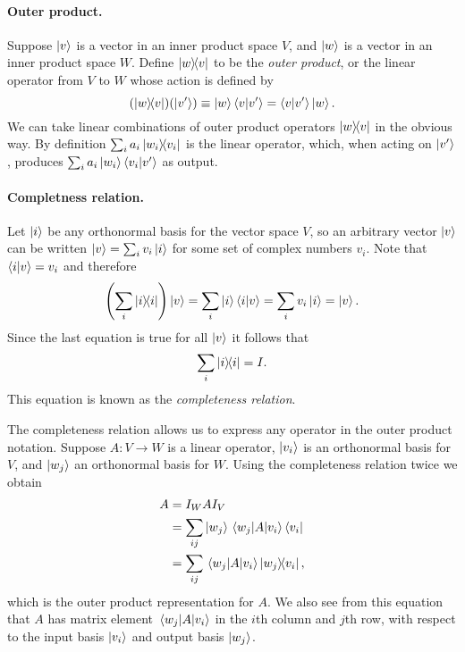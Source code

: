\paragraph{Outer product.} Suppose $\ket{v}$ is a vector in an inner product
space $V$, and $\ket{w}$ is a vector in an inner product space $W$. Define
$\ketbra{w}{v}$ to be the \emph{outer product}, or the linear operator from $V$
to $W$ whose action is defined by \begin{equation}
  (\ketbra{w}{v})(\ket{v'}) \equiv \ket{w}\braket{v}{v'} = \braket{v}{v'}
  \ket{w}. \label{eq:out-prod}
\end{equation} We can take linear combinations of outer product operators
$\ketbra{w}{v}$ in the obvious way. By definition $\sum_i a_i
\ketbra{w_i}{v_i}$ is the linear operator, which, when acting on $\ket{v'}$,
produces $\sum_i a_i\ket{w_i} \braket{v_i}{v'}$ as output.

\paragraph{Completness relation.} Let $\ket{i}$ be any orthonormal basis for
the vector space $V$, so an arbitrary vector $\ket{v}$ can be written $\ket{v}
= \sum_i v_i\ket{i}$ for some set of complex numbers $v_i$. Note that
$\braket{i}{v} = v_i$ and therefore \begin{equation*}
  \left(\sum_i \ketbra{i}{i}\right)\ket{v} = \sum_i \ket{i}\braket{i}{v} =
  \sum_i v_i\ket{i} = \ket{v}.
\end{equation*} Since the last equation is true for all $\ket{v}$ it follows
that \begin{equation} \label{eq:comp-rel}
  \sum_i \ketbra{i}{i} = I.
\end{equation} This equation is known as the \emph{completeness relation}.

The completeness relation allows us to express any operator in the outer
product notation. Suppose $A : V \rightarrow W$ is a linear operator,
$\ket{v_i}$ is an orthonormal basis for $V$, and $\ket{w_j}$ an orthonormal
basis for $W$. Using the completeness relation twice we obtain \begin{align}
  A &= I_WAI_V \nonumber \\
    &= \sum_{ij} \ket{w_j}\mel{w_j}{A}{v_i}\bra{v_i} \nonumber \\
    &= \sum_{ij} \mel{w_j}{A}{v_i}\ketbra{w_j}{v_i}, \label{eq:out-prod-rep}
\end{align} which is the outer product representation for $A$. We also see from
this equation that $A$ has matrix element $\mel{w_j}{A}{v_i}$ in the $i$th
column and $j$th row, with respect to the input basis $\ket{v_i}$ and output
basis $\ket{w_j}$.

